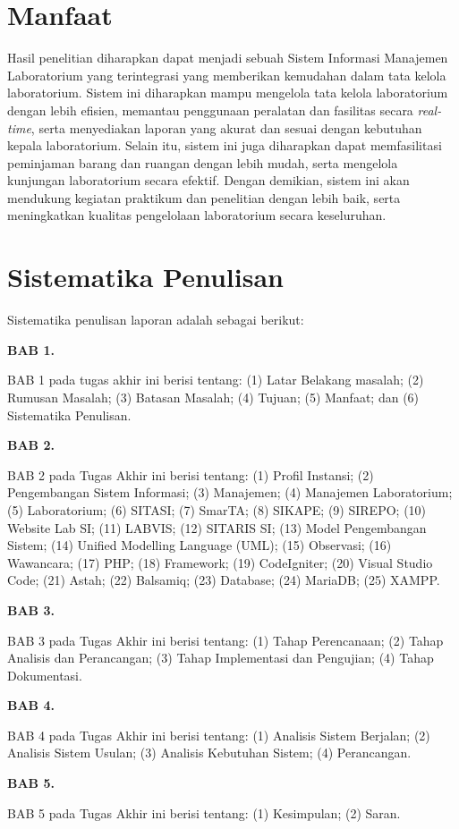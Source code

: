 \section{Manfaat}
Hasil penelitian diharapkan dapat menjadi sebuah Sistem Informasi Manajemen Laboratorium yang terintegrasi yang memberikan kemudahan dalam tata kelola laboratorium. Sistem ini diharapkan mampu mengelola tata kelola laboratorium dengan lebih efisien, memantau penggunaan peralatan dan fasilitas secara \textit{real-time}, serta menyediakan laporan yang akurat dan sesuai dengan kebutuhan kepala laboratorium. Selain itu, sistem ini juga diharapkan dapat memfasilitasi peminjaman barang dan ruangan dengan lebih mudah, serta mengelola kunjungan laboratorium secara efektif. Dengan demikian, sistem ini akan mendukung kegiatan praktikum dan penelitian dengan lebih baik, serta meningkatkan kualitas pengelolaan laboratorium secara keseluruhan.
\section{Sistematika Penulisan}
Sistematika penulisan laporan adalah sebagai berikut:

\textbf{BAB 1. \babSatu}

BAB 1 pada tugas akhir ini berisi tentang: (1) Latar Belakang masalah; (2) Rumusan Masalah; (3) Batasan Masalah; (4) Tujuan; (5) Manfaat; dan (6) Sistematika Penulisan.

\textbf{BAB 2. \babDua}

BAB 2 pada Tugas Akhir ini berisi tentang: (1) Profil Instansi; (2) Pengembangan Sistem Informasi; (3) Manajemen; (4) Manajemen Laboratorium; (5) Laboratorium; (6) SITASI; (7) SmarTA; (8) SIKAPE; (9) SIREPO; (10) Website Lab SI; (11) LABVIS; (12) SITARIS SI; (13) Model Pengembangan Sistem; (14) Unified Modelling Language (UML); (15) Observasi; (16) Wawancara; (17) PHP; (18) Framework; (19) CodeIgniter; (20) Visual Studio Code; (21) Astah; (22) Balsamiq; (23) Database; (24) MariaDB; (25) XAMPP.

\textbf{BAB 3. \babTiga}

BAB 3 pada Tugas Akhir ini berisi tentang: (1) Tahap Perencanaan; (2) Tahap Analisis dan Perancangan; (3) Tahap Implementasi dan Pengujian; (4) Tahap Dokumentasi.

\textbf{BAB 4. \babEmpat}

BAB 4 pada Tugas Akhir ini berisi tentang: (1) Analisis Sistem Berjalan; (2) Analisis Sistem Usulan; (3) Analisis Kebutuhan Sistem; (4) Perancangan.

\textbf{BAB 5. \babLima}

BAB 5 pada Tugas Akhir ini berisi tentang: (1) Kesimpulan; (2) Saran.

